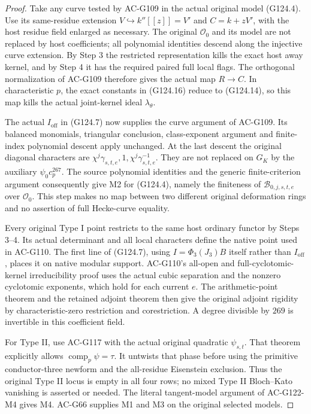 \begin{proof}
Take any curve tested by AC-G109 in the actual original
model (G124.4).  Use its same-residue extension
\(V\hookrightarrow k''[[z]]=V'\) and
\(C=k+zV'\), with the host residue field enlarged as
necessary.  The original \(\mathcal O_0\) and its model
are not replaced by host coefficients; all polynomial
identities descend along the injective curve extension.
By Step 3 the restricted representation kills the exact
host away kernel, and by Step 4 it has the required paired
full local flags.  The orthogonal normalization of
AC-G109 therefore gives the actual map \(R\to C\).
In characteristic \(p\), the exact constants in
(G124.16) reduce to (G124.14), so this map kills the
actual joint-kernel ideal \(\lambda_\theta\).

The actual \(I_{\mathrm{off}}\) in (G124.7) now supplies
the curve argument of AC-G109.  Its balanced monomials,
triangular conclusion, class-exponent argument and
finite-index polynomial descent apply unchanged.
At the last descent the original diagonal characters are
\(\chi^j\gamma_{s,t,e},1,\chi^j\gamma_{s,t,e}^{-1}\).
They are not replaced on \(G_K\) by the auxiliary
\(\psi_0c_p^{267}\).  The source polynomial identities
and the generic finite-criterion argument consequently
give M2 for (G124.4), namely the finiteness of
\(\mathscr B_{0,j,s,t,e}\) over \(\mathcal O_0\).
This step makes no map between two different original
deformation rings and no assertion of full Hecke-curve
equality.

Every original Type I point restricts to the same host
ordinary functor by Steps 3--4.  Its actual determinant
and all local characters define the native point used
in AC-G110.  The first line of (G124.7), using
\(I=\Phi_3(J_3)B\) itself rather than
\(I_{\mathrm{off}}\), places it on native modular
support.  AC-G110's all-open and full-cyclotomic-kernel
irreducibility proof uses the actual cubic separation
and the nonzero cyclotomic exponents, which hold for
each current \(e\).  The arithmetic-point theorem and
the retained adjoint theorem then give the original
adjoint rigidity by characteristic-zero restriction
and corestriction.  A degree divisible by \(269\)
is invertible in this coefficient field.

For Type II, use AC-G117 with the actual original
quadratic \(\psi_{s,t}\).  That theorem explicitly
allows \(\operatorname{comp}_p\psi=\tau\).
It untwists that phase before using the primitive
conductor-three newform and the all-residue Eisenstein
exclusion.  Thus the original Type II locus is empty
in all four rows; no mixed Type II Bloch--Kato vanishing
is asserted or needed.  The literal tangent-model
argument of AC-G122-M4 gives M4.  AC-G66 supplies M1
and M3 on the original selected models.


\end{proof}
